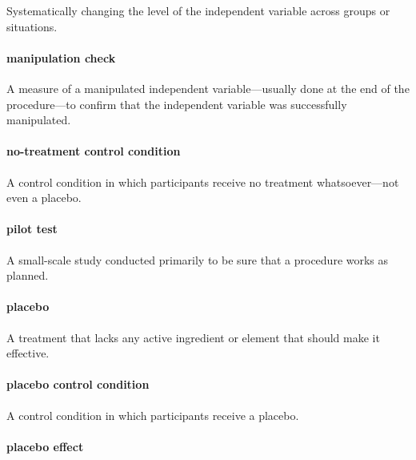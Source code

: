\documentclass[
]{krantz}
\begin{document}
Systematically changing the level of the independent variable across groups or situations.

\paragraph*{manipulation check}\label{manipulation-check}

A measure of a manipulated independent variable---usually done at the end of the procedure---to confirm that the independent variable was successfully manipulated.

\paragraph*{no-treatment control condition}\label{no-treatment-control-condition}

A control condition in which participants receive no treatment whatsoever---not even a placebo.

\paragraph*{pilot test}\label{pilot-test}

A small-scale study conducted primarily to be sure that a procedure works as planned.

\paragraph*{placebo}\label{placebo}

A treatment that lacks any active ingredient or element that should make it effective.

\paragraph*{placebo control condition}\label{placebo-control-condition}

A control condition in which participants receive a placebo.

\paragraph*{placebo effect}\label{placebo-effect}
\end{document}
